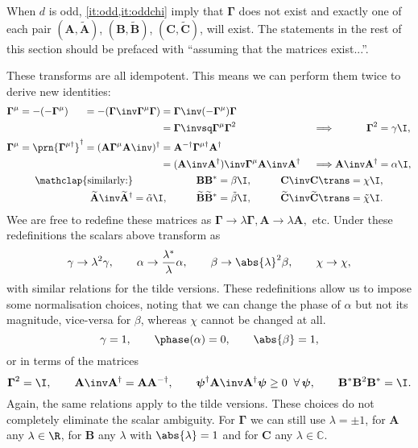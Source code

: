 \documentclass[11pt]{article}
\newcommand{\invd}{^{-\dag}}
\newcommand{\Gammab}{\boldsymbol{\Gamma}}
\newcommand{\Gammap}[1][\mu]{\prn{\Gammab^{#1}}}
\newcommand{\mud}{{\mu\dag}}
\newcommand{\A}{\mathbf{A}}
\newcommand{\B}{\mathbf{B}}
\renewcommand{\C}{\mathbf{C}}
\newcommand{\At}{\widetilde{\mathbf{A}}}
\newcommand{\Bt}{\widetilde{\mathbf{B}}}
\newcommand{\Ct}{\widetilde{\mathbf{C}}}
\newcommand{\Cb}{\mathbb{C}}
\newcommand{\psib}{\boldsymbol{\psi}}
\begin{document}
When $d$ is odd, \cref{it:odd,it:oddchi} imply that $\Gammab$ does not exist and exactly one of each pair $(\A, \At)$, $(\B, \Bt)$, $(\C, \Ct)$, will exist.
The statements in the rest of this section should be prefaced with ``assuming that the matrices exist...''.

These transforms are all idempotent.
This means we can perform them twice to derive new identities:
%
\begin{equation*}
\begin{gathered}
\begin{alignedat}{5}
  \Gammab^\mu &= -(-\Gammab^\mu) &
        &= -(\Gammab\inv \Gammab^\mu \Gammab) &
        &= \Gammab\inv (-\Gammab^\mu) \Gammab \\ && &&
        &= \Gammab\invsq \Gammab^\mu \Gammab^2 &\quad
  &\implies &
  \Gammab^2 &= \gamma \I, \\
  \Gammab^\mu &= \Gammap[\mud]^\dag &
        &= (\A \Gammab^\mu \A\inv)^\dag &
        &= \A\invd \Gammab^\mud \A^\dag \\ && &&
        &= (\A\inv \A^\dag)\inv \Gammab^\mu \A\inv \A^\dag &
  &\implies &
  \A\inv \A^\dag &= \alpha \I,
\end{alignedat} \\
\begin{aligned}
  \mathclap{\text{similarly:}} &&\qquad
  \B \B^\ast &= \beta \I, &\qquad
  \C\inv \C\trans &= \chi \I, \\
  \At\inv \At^\dag &= \tilde{\alpha} \I, &
  \Bt \Bt^\ast &= \tilde{\beta} \I, &
  \Ct\inv \Ct\trans &= \tilde{\chi} \I.
\end{aligned}
\end{gathered}
\end{equation*}
%
Wee are free to redefine these matrices as $\Gammab \rightarrow \lambda \Gammab, \A \rightarrow \lambda \A,$ etc.
Under these redefinitions the scalars above transform as
%
\begin{equation*}
  \gamma \rightarrow \lambda^2 \gamma, \qquad
  \alpha \rightarrow \frac{\lambda^\ast}{\lambda} \alpha, \qquad
  \beta \rightarrow \abs{\lambda}^2 \beta, \qquad
  \chi \rightarrow \chi,
\end{equation*}
%
with similar relations for the tilde versions.
These redefinitions allow us to impose some normalisation choices, noting that we can change the phase of $\alpha$ but not its magnitude, vice-versa for $\beta$, whereas $\chi$ cannot be changed at all.
%
\begin{equation}\label{eq:normscalar}
  \gamma = 1, \qquad
  \phase(\alpha) = 0, \qquad
  \abs{\beta} = 1,
\end{equation}
%
or in terms of the matrices
%
\begin{equation}\label{eq:normmats}
  \Gammab^2 = \I, \qquad
  \A\inv \A^\dag = \A \A\invd, \qquad
  \psib^\dag \A\inv \A^\dag \psib \geq 0 \;\; \forall \, \psib, \qquad
  \B^\ast \B^2 \B^\ast = \I.
\end{equation}
%
Again, the same relations apply to the tilde versions.
These choices do not completely eliminate the scalar ambiguity.
For $\Gammab$ we can still use $\lambda = \pm 1$, for $\A$ any $\lambda \in \R$, for $\B$ any $\lambda$ with $\abs{\lambda} = 1$ and for $\C$ any $\lambda \in \Cb$.
\end{document}
